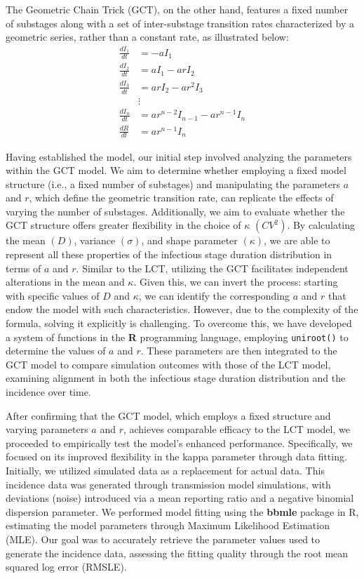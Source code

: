 \documentclass[12pt]{article}
\begin{document}
The Geometric Chain Trick (GCT), on the other hand, features a fixed number of substages along with a set of inter-substage transition rates characterized by a geometric series, rather than a constant rate, as illustrated below:
\begin{align}
    \frac{dI_1}{dt} &= - a I_1 \\
    \frac{dI_2}{dt} &= a I_1 - ar I_2 \\
    \frac{dI_3}{dt} &= ar I_2 - ar^2 I_3 \\
    &\vdots \\
    \frac{dI_n}{dt} &= ar^{n-2} I_{n-1} - ar^{n-1} I_n \\
    \frac{dR}{dt} &= ar^{n-1} I_n
\end{align}

Having established the model, our initial step involved analyzing the parameters within the GCT model. We aim to determine whether employing a fixed model structure (i.e., a fixed number of substages) and manipulating the parameters $a$ and $r$, which define the geometric transition rate, can replicate the effects of varying the number of substages. Additionally, we aim to evaluate whether the GCT structure offers greater flexibility in the choice of $\kappa$ $(CV^2)$. By calculating the mean $(D)$, variance $(\sigma)$, and shape parameter $(\kappa)$, we are able to represent all these properties of the infectious stage duration distribution in terms of $a$ and $r$. Similar to the LCT, utilizing the GCT facilitates independent alterations in the mean and $\kappa$. Given this, we can invert the process: starting with specific values of $D$ and $\kappa$, we can identify the corresponding $a$ and $r$ that endow the model with such characteristics. However, due to the complexity of the formula, solving it explicitly is challenging. To overcome this, we have developed a system of functions in the \textbf{R} programming language, employing \verb|uniroot()| to determine the values of $a$ and $r$. These parameters are then integrated to the GCT model to compare simulation outcomes with those of the LCT model, examining alignment in both the infectious stage duration distribution and the incidence over time.

After confirming that the GCT model, which employs a fixed structure and varying parameters $a$ and $r$, achieves comparable efficacy to the LCT model, we proceeded to empirically test the model's enhanced performance. Specifically, we focused on its improved flexibility in the kappa parameter through data fitting. Initially, we utilized simulated data as a replacement for actual data. This incidence data was generated through transmission model simulations, with deviations (noise) introduced via a mean reporting ratio and a negative binomial dispersion parameter. We performed model fitting using the \textbf{bbmle} package in R, estimating the model parameters through Maximum Likelihood Estimation (MLE). Our goal was to accurately retrieve the parameter values used to generate the incidence data, assessing the fitting quality through the root mean squared log error (RMSLE).
\end{document}
